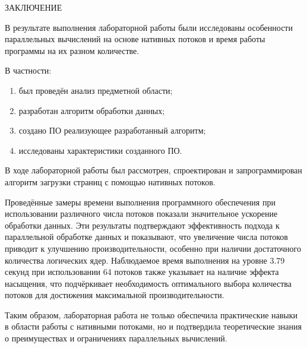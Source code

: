 \begin{center}
    \MakeUppercase{\large Заключение}
\end{center}

В результате выполнения лабораторной работы были исследованы особенности параллельных вычислений на основе нативных потоков и время работы программы на их разном количестве.

\vspace{0.25cm}
В частности:

\begin{enumerate}

\item был проведён анализ предметной области;

\item разработан алгоритм обработки данных;

\item создано ПО реализующее разработанный алгоритм;

\item исследованы характеристики созданного ПО.

\end{enumerate}

В ходе лабораторной работы был рассмотрен, спроектирован и запрограммирован алгоритм загрузки страниц с помощью нативных потоков.

Проведённые замеры времени выполнения программного обеспечения при использовании различного числа потоков показали значительное ускорение обработки данных. Эти результаты подтверждают эффективность подхода к параллельной обработке данных и показывают, что увеличение числа потоков приводит к улучшению производительности, особенно при наличии достаточного количества логических ядер. Наблюдаемое время выполнения на уровне 3.79 секунд при использовании 64 потоков также указывает на наличие эффекта насыщения, что подчёркивает необходимость оптимального выбора количества потоков для достижения максимальной производительности.

Таким образом, лабораторная работа не только обеспечила практические навыки в области работы с нативными потоками, но и подтвердила теоретические знания о преимуществах и ограничениях параллельных вычислений.

\newpage